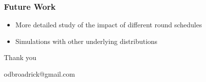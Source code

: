 \documentclass[aspectratio=169]{beamer}
\begin{document}
\begin{frame}
\frametitle{Future Work}
\begin{itemize}
\item More detailed study of the impact of different round schedules
\pause
\item Simulations with other underlying distributions
\end{itemize}
\end{frame}


\begin{frame}
\centering 
\bigskip
\bigskip
\bigskip
Thank you

\bigskip
\bigskip
\bigskip
\bigskip

odbroadrick@gmail.com
\end{frame}



\end{document}
